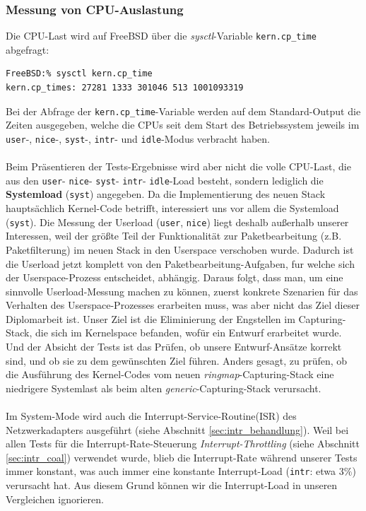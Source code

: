 \subsubsection*{Messung von CPU-Auslastung}
Die CPU-Last wird auf FreeBSD über die \emph{sysctl}-Variable
\lstset{language=bash} \verb+kern.cp_time+ abgefragt:
\begin{lstlisting}[captionpos={b}]
FreeBSD:% sysctl kern.cp_time
kern.cp_times: 27281 1333 301046 513 1001093319
\end{lstlisting}
Bei der Abfrage der \verb+kern.cp_time+-Variable werden auf dem Standard-Output die Zeiten
ausgegeben, welche die CPUs seit dem Start des Betriebssystem jeweils im \verb+user+-,  
\verb+nice+-, \verb+syst+-, \verb+intr+- und \verb+idle+-Modus verbracht
haben.\\\\
Beim Präsentieren der Tests-Ergebnisse wird aber nicht die volle CPU-Last, die
aus den \verb+user+- \verb+nice+- \verb+syst+- \verb+intr+- \verb+idle+-Load
besteht, sondern lediglich die \textbf{Systemload} (\verb+syst+) angegeben.  Da
die Implementierung des neuen Stack hauptsächlich Kernel-Code betrifft,
interessiert uns vor allem die Systemload (\verb+syst+).  Die Messung der
Userload (\verb+user+, \verb+nice+) liegt deshalb außerhalb unserer Interessen,
weil der größte Teil der Funktionalität zur Paketbearbeitung (z.B.
Paketfilterung) im neuen Stack in den Userspace verschoben wurde. Dadurch ist
die Userload jetzt komplett von den Paketbearbeitung-Aufgaben, fur welche sich
der Userspace-Prozess entscheidet, abhängig. Daraus folgt, dass man, um eine
sinnvolle Userload-Messung machen zu können, zuerst konkrete Szenarien für das
Verhalten des Userspace-Prozesses erarbeiten muss, was aber nicht das Ziel
dieser Diplomarbeit ist. Unser Ziel ist die Eliminierung der Engstellen im
Capturing-Stack, die sich im Kernelspace befanden, wofür ein Entwurf erarbeitet
wurde. Und der Absicht der Tests ist das Prüfen, ob unsere Entwurf-Ansätze
korrekt sind, und ob sie zu dem gewünschten Ziel führen. Anders gesagt, zu
prüfen, ob die Ausführung des Kernel-Codes vom neuen
\emph{ringmap}-Capturing-Stack eine niedrigere Systemlast als beim alten
\emph{generic}-Capturing-Stack verursacht. \\\\
%
Im System-Mode wird auch die Interrupt-Service-Routine(ISR) des Netzwerkadapters
ausgeführt (siehe Abschnitt \ref{sec:intr_behandlung}). Weil bei allen Tests
für die Interrupt-Rate-Steuerung \emph{Interrupt-Throttling} (siehe
Abschnitt \ref{sec:intr_coal}) verwendet wurde, blieb die Interrupt-Rate
während unserer Tests immer konstant, was auch immer eine konstante
Interrupt-Load (\verb+intr+: etwa $3\%$) verursacht hat. Aus diesem Grund 
können wir die Interrupt-Load in unseren Vergleichen ignorieren.
%
